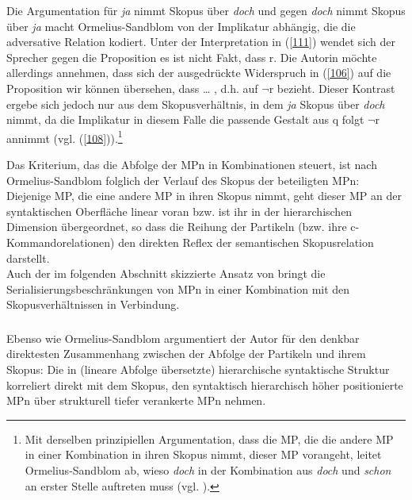 Die Argumentation für \glq \textit{ja} nimmt Skopus über \textit{doch}\grq {} und gegen \glq \textit{doch} nimmt Skopus über \textit{ja}\grq {} macht Ormelius-Sandblom von der Implikatur abhängig, die die adversative Relation kodiert. Unter der Interpretation in (\ref{111}) wendet sich der Sprecher gegen die Proposition \glq es ist nicht Fakt, dass r\grq {}. Die Autorin möchte allerdings annehmen, dass sich der ausgedrückte Widerspruch in (\ref{106}) auf die Proposition \glq wir können übersehen, dass \ldots \grq {} , d.h. auf $\neg$r bezieht. Dieser Kontrast ergebe sich jedoch nur aus dem Skopusverhältnis, in dem \textit{ja} Skopus über \textit{doch} nimmt, da die Implikatur in diesem Falle die passende Gestalt \glq aus q folgt $\neg$r \grq {} annimmt (vgl. (\ref{108})).\footnote{Mit derselben prinzipiellen Argumentation, dass die MP, die die andere MP in einer Kombination in ihren Skopus nimmt, dieser MP vorangeht, leitet Ormelius-Sandblom ab, wieso \textit{doch} in der Kombination aus \textit{doch} und \textit{schon} an erster Stelle auftreten muss (vgl. \citealt[93-94]{Ormelius-Sandblom1997}).}

Das Kriterium, das die Abfolge der MPn in Kombinationen steuert, ist nach Ormelius-Sandblom folglich der Verlauf des Skopus der beteiligten MPn: Diejenige MP, die eine andere MP in ihren Skopus nimmt, geht dieser MP an der syntakti\-schen Oberfläche linear voran bzw. ist ihr in der hierarchischen Dimension übergeordnet, so dass die Reihung der Partikeln (bzw. ihre c-Kommandorelationen)  den direkten Reflex der semantischen Skopusrelation darstellt.\\

\noindent
Auch der im folgenden Abschnitt skizzierte Ansatz von \citet{Rinas2006, Rinas2007} bringt die Seria\-lisierungsbeschränkungen von MPn in einer Kombination mit den Skopusverhältnissen in Verbindung.

\subsubsection{\citet{Rinas2007}}
\label{sec:ri}
Ebenso wie Ormelius-Sandblom argumentiert der Autor für den denkbar direktesten Zusammenhang zwischen der Abfolge der Partikeln und ihrem Skopus: Die in (lineare Abfolge übersetzte) hierarchische syntaktische Struktur korreliert direkt mit dem Skopus, den syntaktisch hierarchisch höher positionierte MPn über strukturell tiefer verankerte MPn nehmen.\\

